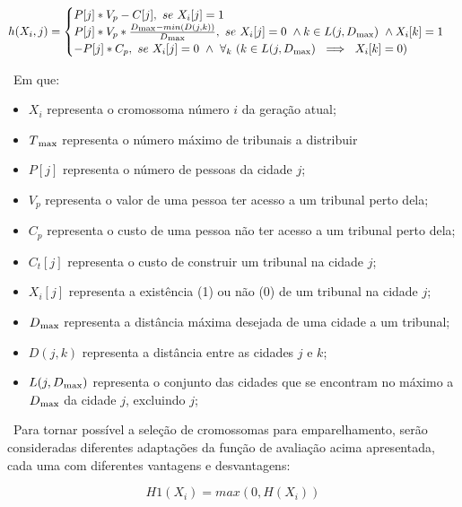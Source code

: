 \documentclass[11pt,a4paper,reqno]{article}
\numberwithin{equation}{section}
\begin{document}
\begin{equation}    
h(X_i, j) = \begin{cases} 
    P[j] * V_p - C[j] ,\  se \  X_i[j] = 1 \\
    P[j] * V_p * \frac{D\textsubscript{max} - min(D(j, k))}{D\textsubscript{max}}, \ se \ X_i[j] = 0 \ \wedge k \in L(j, D\textsubscript{max}) \ \wedge X_i[k] = 1 \\
    -P[j] * C_p,\  se \ X_i[j] = 0 \ \wedge \ \forall _k \ (k \in L(j, D\textsubscript{max}) \ \implies \  X_i[k] = 0) \\
	\end{cases}\\
\end{equation}
	
\	
Em que:
\begin{itemize}
\item $X_i$ representa o cromossoma número $i$ da geração atual;
\item $T\textsubscript{max}$ representa o número máximo de tribunais a distribuir
\item $P[j]$ representa o número de pessoas da cidade $j$;
\item $V_p$ representa o valor de uma pessoa ter acesso a um tribunal perto dela;
\item $C_p$ representa o custo de uma pessoa não ter acesso a um tribunal perto dela;
\item $C_t[j]$ representa o custo de construir um tribunal na cidade $j$;
\item $X_i[j]$ representa a existência (1) ou não (0) de um tribunal na cidade $j$;
\item $D\textsubscript{max}$ representa a distância máxima desejada de uma cidade a um tribunal;
\item $D(j, k)$ representa a distância entre as cidades $j$ e $k$;
\item $L(j, D\textsubscript{max})$ representa o conjunto das cidades que se encontram no máximo a $D\textsubscript{max}$ da cidade $j$, excluindo $j$;
\end{itemize} 

\ 
Para tornar possível a seleção de cromossomas para emparelhamento, serão consideradas diferentes adaptações da função de avaliação acima apresentada, cada uma com diferentes vantagens e desvantagens:

\begin{equation} %
    H1(X_i) = max(0, H(X_i))
\end{equation}
\end{document}
